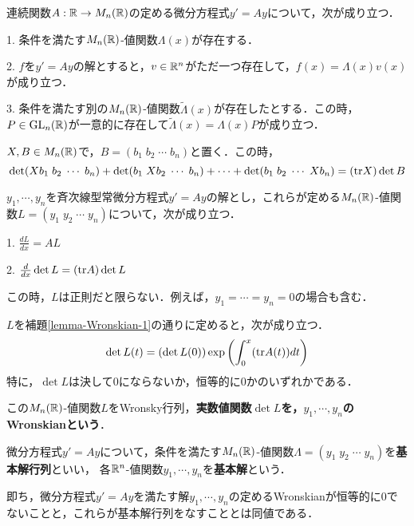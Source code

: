 \documentclass[uplatex,dvipdfmx]{jsreport}
\begin{document}
\begin{theorem}
    連続関数$A:\mathbb{R}\to M_n(\mathbb{R})$の定める微分方程式$y'=Ay$について，次が成り立つ．

    1. 条件を満たす$M_n(\mathbb{R})$-値関数$\Lambda(x)$が存在する．

    2. $f$を$y'=Ay$の解とすると，$v\in\mathbb{R}^n$がただ一つ存在して，$f(x)=\Lambda(x)v(x)$が成り立つ．

    3. 条件を満たす別の$M_n(\mathbb{R})$-値関数$\tilde{\Lambda}(x)$が存在したとする．この時，$P\in\mathrm{GL}_n(\mathbb{R})$が一意的に存在して$\tilde{\Lambda}(x)=\Lambda(x)P$が成り立つ．
\end{theorem}

\begin{lemma}
    $X,B\in M_n(\mathbb{R})$で，$B=(b_1\;b_2\;\cdots\;b_n)$と置く．この時，
    \[ \det(Xb_1\;b_2\;\cdots\;b_n)+\det(b_1\;Xb_2\;\cdots\;b_n)+\cdots+\det(b_1\;b_2\;\cdots\;Xb_n)=(\mathrm{tr} X)\det B \]
\end{lemma}
\begin{lemma}\label{lemma-Wronskian-1}
    $y_1,\cdots,y_n$を斉次線型常微分方程式$y'=Ay$の解とし，これらが定める$M_n(\mathbb{R})$-値関数$L=(y_1\;y_2\;\cdots\;y_n)$について，次が成り立つ．

    1. $\frac{dL}{dx}=AL$

    2. $\frac{d}{dx}\det L=(\mathrm{tr} A)\det L$
\end{lemma}
\begin{remark}
    この時，$L$は正則だと限らない．例えば，$y_1=\cdots=y_n=0$の場合も含む．
\end{remark}
\begin{corollary}
    $L$を補題\ref{lemma-Wronskian-1}の通りに定めると，次が成り立つ．
    \[ \det L(t) = (\det L(0))\exp\left(\int^x_0(\mathrm{tr} A(t))dt\right) \]
    特に，$\det L$は決して$0$にならないか，恒等的に$0$かのいずれかである．
\end{corollary}
\begin{definition}[Wronskian]
    この$M_n(\mathbb{R})$-値関数$L$をWronsky行列，\textbf{実数値関数$\det L$を，$y_1,\cdots,y_n$のWronskianという}．
\end{definition}

\begin{definition}[基本解]
    微分方程式$y'=Ay$について，条件を満たす$M_n(\mathbb{R})$-値関数$\Lambda=(y_1\;y_2\;\cdots\;y_n)$を\textbf{基本解行列}といい，
    各$\mathbb{R}^n$-値関数$y_1,\cdots,y_n$を\textbf{基本解}という．
\end{definition}
即ち，微分方程式$y'=Ay$を満たす解$y_1,\cdots,y_n$の定めるWronskianが恒等的に$0$でないことと，これらが基本解行列をなすこととは同値である．
\end{document}
